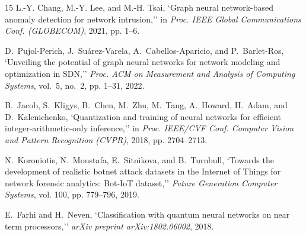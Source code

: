 \documentclass[conference]{IEEEtran}
\begin{document}
\begin{thebibliography}{15}
L.-Y. Chang, M.-Y. Lee, and M.-H. Tsai, `Graph neural network-based anomaly detection for network intrusion,'' in \emph{Proc. IEEE Global Communications Conf. (GLOBECOM)}, 2021, pp. 1--6.

D.~Pujol-Perich, J.~Su{\'a}rez-Varela, A.~Cabellos-Aparicio, and P.~Barlet-Ros, `Unveiling the potential of graph neural networks for network modeling and optimization in {SDN},'' \emph{Proc. ACM on Measurement and Analysis of Computing Systems}, vol.~5, no.~2, pp. 1--31, 2022.

B.~Jacob, S.~Kligys, B.~Chen, M.~Zhu, M.~Tang, A.~Howard, H.~Adam, and D.~Kalenichenko, `Quantization and training of neural networks for efficient integer-arithmetic-only inference,'' in \emph{Proc. IEEE/CVF Conf. Computer Vision and Pattern Recognition (CVPR)}, 2018, pp. 2704--2713.

N.~Koroniotis, N.~Moustafa, E.~Sitnikova, and B.~Turnbull, `Towards the development of realistic botnet attack datasets in the {Internet of Things} for network forensic analytics: {Bot-IoT} dataset,'' \emph{Future Generation Computer Systems}, vol. 100, pp. 779--796, 2019.

E.~Farhi and H.~Neven, `Classification with quantum neural networks on near term processors,'' \emph{arXiv preprint arXiv:1802.06002}, 2018.
\end{thebibliography}
\end{document}
